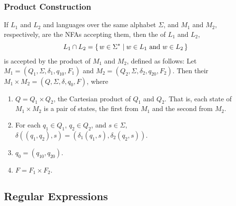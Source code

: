 \begin{Example}
\begin{center}
\end{center}
\end{Example}

\subsubsection{Product Construction}\label{subsubsec:ProductFA}

If $L_1$ and $L_2$ and languages over the same alphabet $\Sigma$, and $M_1$ and $M_2$, respectively, are the NFAs accepting them, then the  of $L_1$ and $L_2$,
\begin{equation*}
L_1 \cap L_2 = \qty{\, w \in \Sigma^* \mid w \in L_1 ~\text{and}~ w \in L_2 \,}
\end{equation*}
is accepted by the product of $M_1$ and $M_2$, defined as follows: Let $M_1 = (Q_1, \Sigma, \delta_1, q_{10}, F_1)$ and $M_2 = (Q_2, \Sigma, \delta_2, q_{20}, F_2)$. Then their  $M_1 \times M_2 = (Q, \Sigma, \delta, q_0, F)$, where
\begin{enumerate}[label = (\roman*)]
\item $Q = Q_1 \times Q_2$, the Cartesian product of $Q_1$ and $Q_2$. That is, each state of $M_1 \times M_2$ is a pair of states, the first from $M_1$ and the second from $M_2$.
\item For each $q_1 \in Q_1$, $q_2 \in Q_2$, and $s \in \Sigma$, $\delta((q_1, q_2), s) = (\delta_1(q_1, s), \delta_2(q_2, s))$.
\item $q_0 = (q_{10}, q_{20})$.
\item $F = F_1 \times F_2$.
\end{enumerate}

\subsection{Regular Expressions}\label{subsec:RE}

